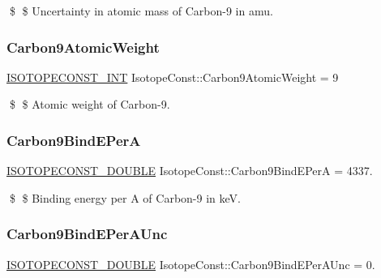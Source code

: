 \$ \$ Uncertainty in atomic mass of Carbon-\/9 in amu. \mbox{\label{group___isotope_const-_carbon-_c9_gaf679b6e4e8a4561332f392b3e13b64df}} 
\subsubsection{\texorpdfstring{Carbon9\+Atomic\+Weight}{Carbon9AtomicWeight}}
{\footnotesize\ttfamily \mbox{\hyperlink{group___isotope_const-_macros_ga5f18360b3e99483a35c32d789e62621c}{I\+S\+O\+T\+O\+P\+E\+C\+O\+N\+S\+T\+\_\+\+I\+NT}} Isotope\+Const\+::\+Carbon9\+Atomic\+Weight = 9}

\$ \$ Atomic weight of Carbon-\/9. \mbox{\label{group___isotope_const-_carbon-_c9_ga15366614931387fd42b135351daef681}} 
\subsubsection{\texorpdfstring{Carbon9\+Bind\+E\+PerA}{Carbon9BindEPerA}}
{\footnotesize\ttfamily \mbox{\hyperlink{group___isotope_const-_macros_ga8f45a7272ce02c0b4c65c44636ed719a}{I\+S\+O\+T\+O\+P\+E\+C\+O\+N\+S\+T\+\_\+\+D\+O\+U\+B\+LE}} Isotope\+Const\+::\+Carbon9\+Bind\+E\+PerA = 4337.}

\$ \$ Binding energy per A of Carbon-\/9 in keV. \mbox{\label{group___isotope_const-_carbon-_c9_gafd4f330da6670a2e3c04c15772e37b12}} 
\subsubsection{\texorpdfstring{Carbon9\+Bind\+E\+Per\+A\+Unc}{Carbon9BindEPerAUnc}}
{\footnotesize\ttfamily \mbox{\hyperlink{group___isotope_const-_macros_ga8f45a7272ce02c0b4c65c44636ed719a}{I\+S\+O\+T\+O\+P\+E\+C\+O\+N\+S\+T\+\_\+\+D\+O\+U\+B\+LE}} Isotope\+Const\+::\+Carbon9\+Bind\+E\+Per\+A\+Unc = 0.}

